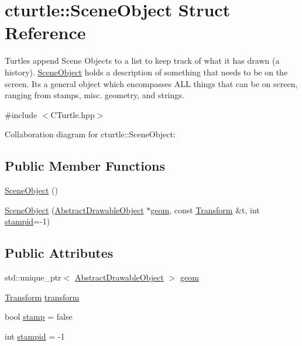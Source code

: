 \hypertarget{structcturtle_1_1SceneObject}{}\section{cturtle\+:\+:Scene\+Object Struct Reference}
\label{structcturtle_1_1SceneObject}


Turtles append Scene Objects to a list to keep track of what it has drawn (a history). \hyperlink{structcturtle_1_1SceneObject}{Scene\+Object} holds a description of something that needs to be on the screen. It\textquotesingle{}s a general object which encompasses A\+LL things that can be on screen, ranging from stamps, misc. geometry, and strings.  




{\ttfamily \#include $<$C\+Turtle.\+hpp$>$}



Collaboration diagram for cturtle\+:\+:Scene\+Object\+:
\subsection*{Public Member Functions}
\begin{DoxyCompactItemize}
\item 
\hyperlink{structcturtle_1_1SceneObject_ac51b04f4e0509e37a7acce739e608e49}{Scene\+Object} ()
\item 
\hyperlink{structcturtle_1_1SceneObject_a278686eef9384bed5d891065a3a02619}{Scene\+Object} (\hyperlink{classcturtle_1_1AbstractDrawableObject}{Abstract\+Drawable\+Object} $\ast$\hyperlink{structcturtle_1_1SceneObject_a1db44363183fd197b232d5f6e4b89b5c}{geom}, const \hyperlink{classcturtle_1_1Transform}{Transform} \&t, int \hyperlink{structcturtle_1_1SceneObject_ae6094918613e5d4d284805cd5afb2e65}{stampid}=-\/1)
\end{DoxyCompactItemize}
\subsection*{Public Attributes}
\begin{DoxyCompactItemize}
\item 
std\+::unique\+\_\+ptr$<$ \hyperlink{classcturtle_1_1AbstractDrawableObject}{Abstract\+Drawable\+Object} $>$ \hyperlink{structcturtle_1_1SceneObject_a1db44363183fd197b232d5f6e4b89b5c}{geom}
\item 
\hyperlink{classcturtle_1_1Transform}{Transform} \hyperlink{structcturtle_1_1SceneObject_a427fb0ab63fa9e0dd5c7b5c15ac3f6f4}{transform}
\item 
bool \hyperlink{structcturtle_1_1SceneObject_a014644aee0792d77bd84a0b98464f39b}{stamp} = false
\item 
int \hyperlink{structcturtle_1_1SceneObject_ae6094918613e5d4d284805cd5afb2e65}{stampid} = -\/1
\end{DoxyCompactItemize}


